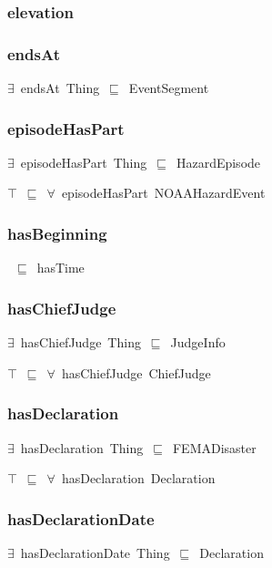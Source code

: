 \documentclass{article}
\begin{document}
\subsubsection*{elevation}

\subsubsection*{endsAt}

\ensuremath{\exists}~endsAt~Thing~\ensuremath{\sqsubseteq}~EventSegment

\subsubsection*{episodeHasPart}

\ensuremath{\exists}~episodeHasPart~Thing~\ensuremath{\sqsubseteq}~HazardEpisode

\ensuremath{\top}~\ensuremath{\sqsubseteq}~\ensuremath{\forall}~episodeHasPart~NOAAHazardEvent

\subsubsection*{hasBeginning}

~\ensuremath{\sqsubseteq}~hasTime

\subsubsection*{hasChiefJudge}

\ensuremath{\exists}~hasChiefJudge~Thing~\ensuremath{\sqsubseteq}~JudgeInfo

\ensuremath{\top}~\ensuremath{\sqsubseteq}~\ensuremath{\forall}~hasChiefJudge~ChiefJudge

\subsubsection*{hasDeclaration}

\ensuremath{\exists}~hasDeclaration~Thing~\ensuremath{\sqsubseteq}~FEMADisaster

\ensuremath{\top}~\ensuremath{\sqsubseteq}~\ensuremath{\forall}~hasDeclaration~Declaration

\subsubsection*{hasDeclarationDate}

\ensuremath{\exists}~hasDeclarationDate~Thing~\ensuremath{\sqsubseteq}~Declaration
\end{document}
